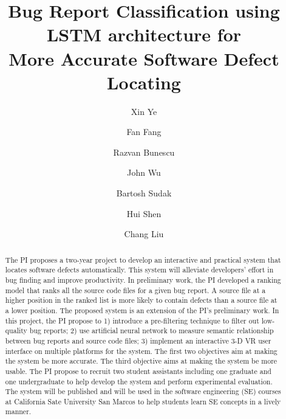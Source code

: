 \documentclass[sigconf, review, anonymous]{acmart}
\begin{document}
\title{Bug Report Classification using LSTM architecture for \\More Accurate Software Defect Locating}

\author{Xin Ye}

\author{Fan Fang}

\author{Razvan Bunescu}

\author{John Wu}

\author{Bartosh Sudak}

\author{Hui Shen}

\author{Chang Liu}

\begin{abstract}
The PI proposes a two-year project to develop an interactive and practical system that locates software defects automatically. This system will alleviate developers' effort in bug finding and improve productivity. In preliminary work, the PI developed a ranking model that ranks all the source code files for a given bug report. A source file at a higher position in the ranked list is more likely to contain defects than a source file at a lower position. The proposed system is an extension of the PI's preliminary work. In this project, the PI propose to 1) introduce a pre-filtering technique to filter out low-quality bug reports; 2) use artificial neural network to measure semantic relationship between bug reports and source code files; 3) implement an interactive 3-D VR user interface on multiple platforms for the system. The first two objectives aim at making the system be more accurate. The third objective aims at making the system be more usable. The PI propose to recruit two student assistants including one graduate and one undergraduate to help develop the system and perform experimental evaluation. The system will be published and will be used in the software engineering (SE) courses at California Sate University San Marcos to help students learn SE concepts in a lively manner.
\end{abstract}
\end{document}
